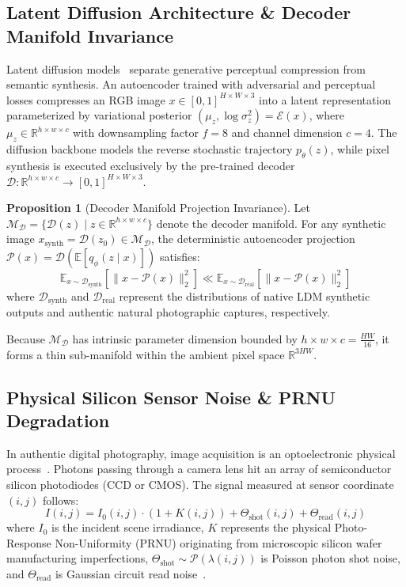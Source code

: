 \documentclass[11pt]{article}
\theoremstyle{definition}
\newtheorem{proposition}{Proposition}
\begin{document}
\subsection{Latent Diffusion Architecture \& Decoder Manifold Invariance}
Latent diffusion models~\citep{rombach2022ldm} separate generative perceptual compression from semantic synthesis. An autoencoder trained with adversarial and perceptual losses compresses an RGB image $x \in [0, 1]^{H \times W \times 3}$ into a latent representation parameterized by variational posterior $(\mu_z, \log \sigma_z^2) = \mathcal{E}(x)$, where $\mu_z \in \mathbb{R}^{h \times w \times c}$ with downsampling factor $f = 8$ and channel dimension $c = 4$. The diffusion backbone models the reverse stochastic trajectory $p_\theta(z)$, while pixel synthesis is executed exclusively by the pre-trained decoder $\mathcal{D}: \mathbb{R}^{h \times w \times c} \to [0, 1]^{H \times W \times 3}$.

\begin{proposition}[Decoder Manifold Projection Invariance]
Let $\mathcal{M}_{\mathcal{D}} = \{ \mathcal{D}(z) \mid z \in \mathbb{R}^{h \times w \times c} \}$ denote the decoder manifold. For any synthetic image $x_{\text{synth}} = \mathcal{D}(z_0) \in \mathcal{M}_{\mathcal{D}}$, the deterministic autoencoder projection $\mathcal{P}(x) = \mathcal{D}(\mathbb{E}[q_\phi(z \mid x)])$ satisfies:
\begin{equation}
\mathbb{E}_{x \sim \mathcal{D}_{\text{synth}}}\left[ \| x - \mathcal{P}(x) \|_2^2 \right] \ll \mathbb{E}_{x \sim \mathcal{D}_{\text{real}}}\left[ \| x - \mathcal{P}(x) \|_2^2 \right]
\end{equation}
where $\mathcal{D}_{\text{synth}}$ and $\mathcal{D}_{\text{real}}$ represent the distributions of native LDM synthetic outputs and authentic natural photographic captures, respectively.
\end{proposition}

Because $\mathcal{M}_{\mathcal{D}}$ has intrinsic parameter dimension bounded by $h \times w \times c = \frac{H W}{16}$, it forms a thin sub-manifold within the ambient pixel space $\mathbb{R}^{3HW}$.

\subsection{Physical Silicon Sensor Noise \& PRNU Degradation}
In authentic digital photography, image acquisition is an optoelectronic physical process~\citep{fridrich2009digital}. Photons passing through a camera lens hit an array of semiconductor silicon photodiodes (CCD or CMOS). The signal measured at sensor coordinate $(i, j)$ follows:
\begin{equation}
I(i, j) = I_0(i, j) \cdot (1 + K(i, j)) + \Theta_{\text{shot}}(i, j) + \Theta_{\text{read}}(i, j)
\end{equation}
where $I_0$ is the incident scene irradiance, $K$ represents the physical Photo-Response Non-Uniformity (PRNU) originating from microscopic silicon wafer manufacturing imperfections, $\Theta_{\text{shot}} \sim \mathcal{P}(\lambda(i, j))$ is Poisson photon shot noise, and $\Theta_{\text{read}}$ is Gaussian circuit read noise~\citep{lukas2006digital}.
\end{document}
